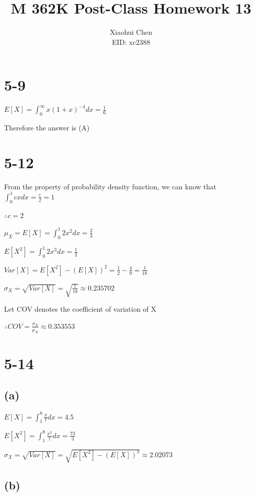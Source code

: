 \documentclass[12pt]{article}
\author{Xiaohui Chen \\EID: xc2388}
\title{M 362K Post-Class Homework 13}
\begin{document}
\maketitle
\begin{spacing}{2.0}

\section*{5-9}

$E[X]= \int_{0}^{\infty} x(1+x)^{-4} dx = \frac{1}{6}$

Therefore the answer is (A)

\section*{5-12}

From the property of probability density function, we can know that $\int_{0}^{1} cx dx = \frac{c}{2} = 1$

$\therefore c=2$

$\mu_X = E[X] = \int_{0}^{1} 2x^2 dx = \frac{2}{3}$

$E[X^2]= \int_{0}^{1} 2x^3 dx = \frac{1}{2}$

$Var[X] = E[X^2]- \left(E[X]\right)^2 = \frac{1}{2} - \frac{4}{9}= \frac{1}{18} $

$\sigma_X= \sqrt{Var[X]}= \sqrt{\frac{1}{18}} \approx 0.235702$

Let COV denotes the coefficient of variation of X

$\therefore COV= \frac{\sigma_X}{\mu_X} \approx 0.353553$

\section*{5-14}

\subsection*{(a)}

$E[X]= \int_{1}^{8} \frac{x}{7} dx = 4.5$

$E[X^2] = \int_{1}^{8} \frac{x^2}{7} dx = \frac{73}{3}$

$\sigma_X= \sqrt{Var[X]} = \sqrt{E[X^2]- \left( E[X] \right)^2 } \approx 2.02073$

\subsection*{(b)}


\end{spacing}
\end{document}
